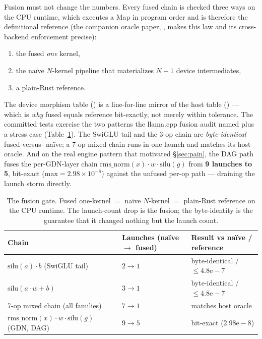 \documentclass[11pt]{article}
\begin{document}
Fusion must not change the numbers. Every fused chain is checked three ways on the CPU runtime, which
executes a Map in program order and is therefore the definitional reference (the companion oracle paper,
\cite{oracle}, makes this law and its cross-backend enforcement precise):
\begin{enumerate}[leftmargin=1.5em,itemsep=1pt]
\item the fused \emph{one} kernel,
\item the na\"ive \emph{$N$}-kernel pipeline that materializes $N{-}1$ device intermediates,
\item a plain-Rust reference.
\end{enumerate}
The device morphism table () is a line-for-line mirror of the host table
() --- which is \emph{why} fused equals reference bit-exactly, not merely within
tolerance. The committed tests exercise the two patterns the llama.cpp fusion audit named plus a stress
case (Table~\ref{tab:fuse}). The SwiGLU tail and the 3-op chain are \emph{byte-identical} fused-versus-
na\"ive; a 7-op mixed chain runs in one launch and matches its host oracle. And on the real engine
pattern that motivated \S\ref{sec:pain}, the DAG path fuses the per-GDN-layer chain
$\mathrm{rms\_norm}(x)\cdot w\cdot\mathrm{silu}(g)$ from \textbf{9 launches to 5}, bit-exact
($\text{max}=2.98\times10^{-8}$) against the unfused per-op path --- draining the launch storm directly.

\begin{table}[h]
\centering\small
\setlength{\tabcolsep}{6pt}
\begin{tabular}{@{}lll@{}}
\toprule
\textbf{Chain} & \textbf{Launches (na\"ive $\to$ fused)} & \textbf{Result vs na\"ive / reference} \\
\midrule
$\mathrm{silu}(a)\cdot b$ (SwiGLU tail)      & $2 \to 1$ & byte-identical / $\le 4.8\mathrm{e}{-}7$ \\
$\mathrm{silu}(a\cdot w + b)$                & $3 \to 1$ & byte-identical / $\le 4.8\mathrm{e}{-}7$ \\
7-op mixed chain (all families)              & $7 \to 1$ & matches host oracle \\
$\mathrm{rms\_norm}(x)\cdot w\cdot\mathrm{silu}(g)$ (GDN, DAG) & $9 \to 5$ & bit-exact ($2.98\mathrm{e}{-}8$) \\
\bottomrule
\end{tabular}
\caption{The fusion gate. Fused one-kernel $=$ na\"ive $N$-kernel $=$ plain-Rust reference on the CPU
runtime. The launch-count drop is the fusion; the byte-identity is the guarantee that it changed nothing
but the launch count.}
\label{tab:fuse}
\end{table}
\end{document}
